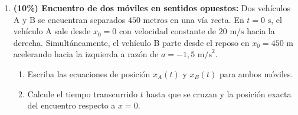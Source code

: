\documentclass[11pt, letterpaper]{article}
\newif\ifmostrarrespuestas
\newcommand{\respuesta}[1]{
	\ifmostrarrespuestas
	\par\vspace{0.2cm}
	\begin{tcolorbox}[colback=blue!5!white, colframe=valblue, coltext=blue!80!black, boxrule=0.5pt, arc=1mm, left=2mm, right=2mm, top=1.5mm, bottom=1.5mm]
		\footnotesize \textbf{\textcolor{valblue}{Solución Paso a Paso (Docente):}} #1
	\end{tcolorbox}
	\vspace{0.2cm}
	\fi
}
\begin{document}
\begin{enumerate}[leftmargin=*, itemsep=0.6cm]
		\item \textbf{(10\%) Encuentro de dos móviles en sentidos opuestos:} Dos vehículos A y B se encuentran separados $450\text{ metros}$ en una vía recta. En $t = 0\text{ s}$, el vehículo A sale desde $x_0 = 0$ con velocidad constante de $20\text{ m/s}$ hacia la derecha. Simultáneamente, el vehículo B parte desde el reposo en $x_0 = 450\text{ m}$ acelerando hacia la izquierda a razón de $a = -1,5\text{ m/s}^2$.
		\begin{enumerate}[label=\alph*., itemsep=0.2cm]
			\item Escriba las ecuaciones de posición $x_A(t)$ y $x_B(t)$ para ambos móviles.
			\item Calcule el tiempo transcurrido $t$ hasta que se cruzan y la posición exacta del encuentro respecto a $x = 0$.
		\end{enumerate}
		\respuesta{
			\textbf{a)} $x_A(t) = 20 t$ \quad | \quad $x_B(t) = 450 + 0 \cdot t + \frac{1}{2}(-1,5) t^2 = 450 - 0,75 t^2$.\\[0.1cm]
			\textbf{b)} Igualando $x_A = x_B \implies 20 t = 450 - 0,75 t^2 \implies 0,75 t^2 + 20 t - 450 = 0$.\\
			Multiplicando por 4: $3 t^2 + 80 t - 1800 = 0$.\\
			Usando la fórmula cuadrática: $t = \frac{-80 \pm \sqrt{6400 - 4(3)(-1800)}}{6} = \frac{-80 \pm \sqrt{28000}}{6} \approx \frac{-80 + 167,33}{6} \approx \mathbf{14,56}\text{ \textbf{s}}$.\\
			Posición de encuentro: $x_A = 20(14,56) = \mathbf{291,2}\text{ \textbf{m}}$.
		}
		

\end{enumerate}
\end{document}
